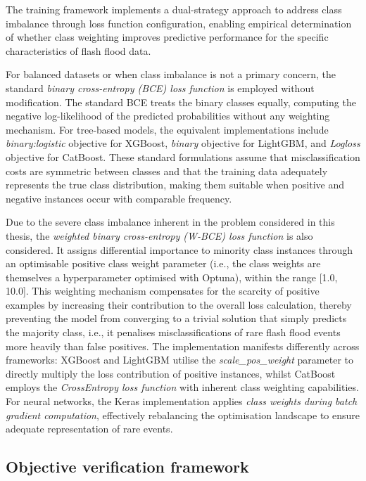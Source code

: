 \documentclass[nhess, manuscript]{copernicus}
\begin{document}
The training framework implements a dual-strategy approach to address class imbalance through loss function configuration, enabling empirical determination of whether class weighting improves predictive performance for the specific characteristics of flash flood data. 

For balanced datasets or when class imbalance is not a primary concern, the standard \textit{binary cross-entropy (BCE) loss function} is employed without modification. The standard BCE treats the binary classes equally, computing the negative log-likelihood of the predicted probabilities without any weighting mechanism. For tree-based models, the equivalent implementations include \textit{binary:logistic} objective for XGBoost, \textit{binary} objective for LightGBM, and \textit{Logloss} objective for CatBoost. These standard formulations assume that misclassification costs are symmetric between classes and that the training data adequately represents the true class distribution, making them suitable when positive and negative instances occur with comparable frequency.

Due to the severe class imbalance inherent in the problem considered in this thesis, the \textit{weighted binary cross-entropy (W-BCE) loss function} is also considered. It assigns differential importance to minority class instances through an optimisable positive class weight parameter (i.e., the class weights are themselves a hyperparameter optimised with Optuna), within the range [1.0, 10.0]. This weighting mechanism compensates for the scarcity of positive examples by increasing their contribution to the overall loss calculation, thereby preventing the model from converging to a trivial solution that simply predicts the majority class, i.e., it penalises misclassifications of rare flash flood events more heavily than false positives. The implementation manifests differently across frameworks: XGBoost and LightGBM utilise the \textit{scale\_pos\_weight} parameter to directly multiply the loss contribution of positive instances, whilst CatBoost employs the \textit{CrossEntropy loss function} with inherent class weighting capabilities. For neural networks, the Keras implementation applies \textit{class weights during batch gradient computation}, effectively rebalancing the optimisation landscape to ensure adequate representation of rare events.


\subsection{Objective verification framework}
\end{document}
